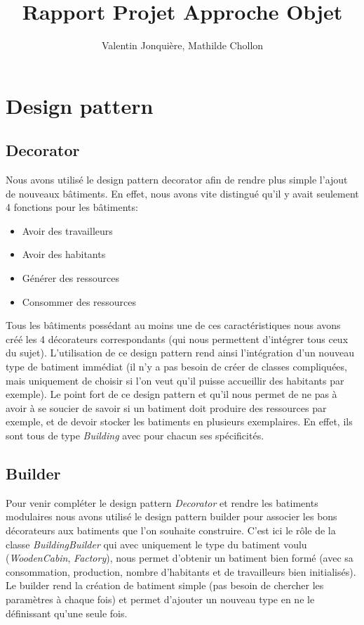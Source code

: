 \documentclass{article}
\author{
    Valentin Jonquière,
    Mathilde Chollon
}
\title{Rapport Projet Approche Objet}
\begin{document}
\maketitle

\pagebreak

\tableofcontents

\pagebreak

\section{Design pattern}
\subsection{Decorator}
Nous avons utilisé le design pattern decorator afin de rendre plus simple l'ajout de nouveaux bâtiments.
En effet, nous avons vite distingué qu'il y avait seulement 4 fonctions pour les bâtiments:
\begin{itemize}
    \item Avoir des travailleurs
    \item Avoir des habitants
    \item Générer des ressources
    \item Consommer des ressources
\end{itemize}
Tous les bâtiments possédant au moins une de ces caractéristiques nous avons créé les 4 décorateurs correspondants
(qui nous permettent d'intégrer tous ceux du sujet). L'utilisation de ce design pattern rend ainsi l'intégration
d'un nouveau type de batiment immédiat (il n'y a pas besoin de créer de classes compliquées, mais uniquement de choisir
si l'on veut qu'il puisse accueillir des habitants par exemple). Le point fort de ce design pattern et qu'il nous permet
de ne pas à avoir à se soucier de savoir si un batiment doit produire des ressources par exemple, et de devoir stocker les
batiments en plusieurs exemplaires. En effet, ils sont tous de type \textit{Building} avec pour chacun ses spécificités.

\subsection{Builder}
Pour venir compléter le design pattern \textit{Decorator} et rendre les batiments modulaires nous avons utilisé le design
pattern builder pour associer les bons décorateurs aux batiments que l'on souhaite construire. C'est ici le rôle de la
classe \textit{BuildingBuilder} qui avec uniquement le type du batiment voulu (\textit{WoodenCabin}, \textit{Factory}), 
nous permet d'obtenir un batiment bien formé (avec sa consommation, production, nombre d'habitants et de travailleurs bien 
initialisés). Le builder rend la création de batiment simple (pas besoin de chercher les paramètres à chaque fois) et permet 
d'ajouter un nouveau type en ne le définissant qu'une seule fois.
\end{document}
